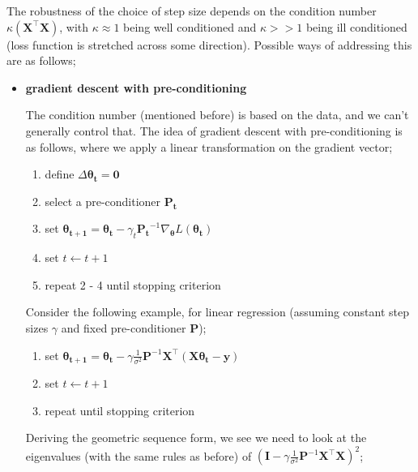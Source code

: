 \documentclass[a4paper, 12pt]{article}
\newcommand{\mat}[1]{\boldsymbol{#1}}
\renewcommand{\vec}[1]{\boldsymbol{#1}}
\begin{document}
            The robustness of the choice of step size depends on the condition number $\kappa(\mat{X}^\top\mat{X})$, with $\kappa \approx 1$ being well conditioned and $\kappa >> 1$ being ill conditioned (loss function is stretched across some direction).
            Possible ways of addressing this are as follows;
            \begin{itemize}
                \itemsep0em
                \item \textbf{gradient descent with pre-conditioning}
                    \smallskip

                    The condition number (mentioned before) is based on the data, and we can't generally control that.
                    The idea of gradient descent with pre-conditioning is as follows, where we apply a linear transformation on the gradient vector;
                    \begin{enumerate}[1.]
                        \itemsep0em
                        \item define $\Delta \mat{\theta_t} = \mat{0}$
                        \item select a pre-conditioner $\mat{P_t}$
                        \item set $\mat{\theta_{t + 1}} = \mat{\theta_t} - \gamma_t \mat{P_t}^{-1} \nabla_{\mat{\theta}}L(\vec{\theta_t})$
                        \item set $t \leftarrow t + 1$
                        \item repeat 2 - 4 until stopping criterion
                    \end{enumerate}
                    Consider the following example, for linear regression (assuming constant step sizes $\gamma$ and fixed pre-conditioner $\mat{P}$);
                    \begin{enumerate}[1.]
                        \itemsep0em
                        \item set $\mat{\theta_{t + 1}} = \mat{\theta_t} - \gamma\frac{1}{\sigma^2} \mat{P}^{-1} \mat{X}^\top(\mat{X}\mat{\theta_t} - \mat{y})$
                        \item set $t \leftarrow t + 1$
                        \item repeat until stopping criterion
                    \end{enumerate}
                    Deriving the geometric sequence form, we see we need to look at the eigenvalues (with the same rules as before) of $(\mat{I} - \gamma\frac{1}{\sigma^2} \mat{P}^{-1} \mat{X}^\top\mat{X})^2$;

\end{itemize}
\end{document}
